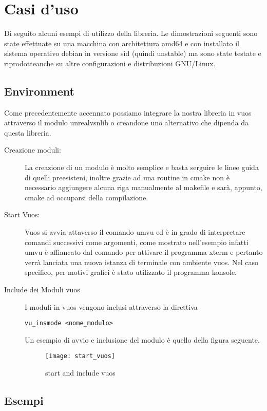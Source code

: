 

\chapter{Casi d'uso}                %
\lhead[\fancyplain{}{\bfseries\thepage}]{\fancyplain{}{\bfseries\rightmark}}
Di seguito alcuni esempi di utilizzo della libreria.
Le dimostrazioni seguenti sono state effettuate su una macchina con architettura amd64 e con installato il sistema operativo debian in versione sid (quindi unstable) ma sono state testate e riprodotteanche su altre configurazioni e distribuzioni GNU/Linux.
\section{Environment}
Come precedentemente accennato possiamo integrare la nostra libreria in vuos attraverso il modulo unrealvsnlib o creandone uno alternativo che dipenda da questa libreria.\\
\begin{description}
\item[Creazione moduli:] La creazione di un modulo \`e molto semplice e basta serguire le linee guida di quelli preesisteni, inoltre grazie ad una routine in cmake non \`e necessario aggiungere alcuna riga manualmente al makefile e sar\`a, appunto, cmake ad occuparsi della compilazione.
\item[Start Vuos:] Vuos si avvia attaverso il comando umvu ed \`e in grado di interpretare comandi successivi come argomenti, come mostrato nell'esempio infatti umvu \`e affiancato dal comando per attivare il programma xterm e pertanto verr\`a lanciata una nuova istanza di terminale con ambiente vuos. Nel caso specifico, per motivi grafici \`e stato utilizzato il programma konsole.
\item[Include dei Moduli vuos] I moduli in vuos vengono inclusi attraverso la direttiva 
\begin{verbatim}
vu_insmode <nome_modulo>
\end{verbatim} 
Un esempio di avvio e inclusione del modulo \`e quello della figura seguente.
\begin{figure}[h]                       %
\begin{center}                          %
\texttt{[image: start\_vuos]}%
%
\caption[start/include\_mod vuos]{start and include vuos}\label{fig:map}
\end{center}
\end{figure}   
\end{description}
\section{Esempi}                 %

\clearpage{\pagestyle{empty}\cleardoublepage} 
